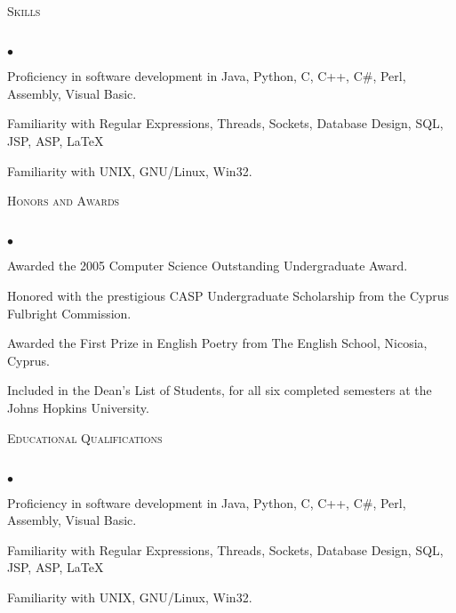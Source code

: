 \documentclass{article}
\newcommand{\lineunder}{\vspace*{-8pt} \\ \hspace*{-18pt} \hrulefill \\}
\newcommand{\header}[1]{{\hspace*{-15pt}\vspace*{6pt} \textsc{#1}} \vspace*{-6pt} \lineunder}
\newenvironment{achievements}{\begin{list}{$\bullet$}{\topsep 0pt \itemsep -2pt}}{\vspace*{4pt}\end{list}}
\begin{document}
\header{Skills}
\begin{achievements}
\item Proficiency in software development in Java, Python, C, C++, C\#, Perl, Assembly, Visual Basic.
\item Familiarity with Regular Expressions, Threads, Sockets, Database Design, SQL, JSP, ASP, \LaTeX
\item Familiarity with UNIX, GNU/Linux, Win32.
\end{achievements}














\header{Honors and Awards}
\begin{achievements}
\item  Awarded the 2005 Computer Science Outstanding Undergraduate Award.
\item Honored with the prestigious CASP Undergraduate Scholarship from the Cyprus Fulbright Commission.
\item  Awarded the First Prize in English Poetry from The English School, Nicosia, Cyprus.
\item Included in the Dean's List of Students, for all six completed semesters at the Johns Hopkins University.
\end{achievements}



\header{Educational Qualifications}
\begin{achievements}
\item Proficiency in software development in Java, Python, C, C++, C\#, Perl, Assembly, Visual Basic.
\item Familiarity with Regular Expressions, Threads, Sockets, Database Design, SQL, JSP, ASP, \LaTeX
\item Familiarity with UNIX, GNU/Linux, Win32.
\end{achievements}
\end{document}
